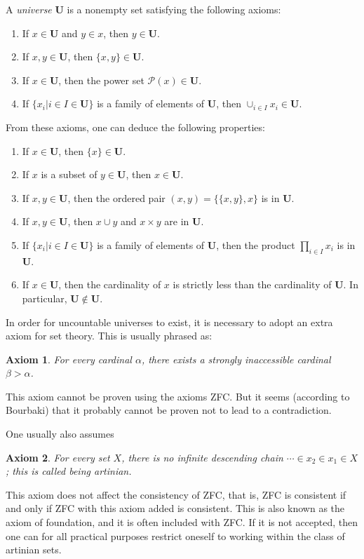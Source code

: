 \documentclass[12pt]{article}
\newtheorem{axiom}{Axiom}
\begin{document}
A {\em universe} $\mathbf{U}$ is a nonempty set satisfying the following axioms:
\begin{enumerate}
  \item If $x\in \mathbf{U}$ and $y\in x$, then $y\in \mathbf{U}$.
  \item If $x,y\in \mathbf{U}$, then $\{x,y\}\in \mathbf{U}$.
  \item If $x\in\mathbf{U}$, then the power set $\mathcal{P}(x)\in\mathbf{U}$.
  \item If $\{x_i | i\in I\in\mathbf{U}\}$ is a family of elements of
        $\mathbf{U}$, then $\cup_{i\in I} x_i\in\mathbf{U}$.
\end{enumerate}

From these axioms, one can deduce the following properties:
\begin{enumerate}
  \item If $x\in\mathbf{U}$, then $\{x\}\in\mathbf{U}$.
  \item If $x$ is a subset of $y\in\mathbf{U}$, then $x\in\mathbf{U}$.
  \item If $x,y\in\mathbf{U}$, then the ordered pair 
        $(x,y) = \{\{x,y\},x\}$ is in $\mathbf{U}$.
  \item If $x,y\in\mathbf{U}$, then $x\cup y$ and $x\times y$ are in 
        $\mathbf{U}$.
  \item If $\{x_i | i\in I\in\mathbf{U}\}$ is a family of elements of
        $\mathbf{U}$, then the product $\prod_{i\in I} x_i$ is in $\mathbf{U}$.
  \item If $x\in \mathbf{U}$, then the cardinality of $x$ is strictly less than
        the cardinality of $\mathbf{U}$.  In particular, 
        $\mathbf{U}\notin\mathbf{U}$.
\end{enumerate}

In order for uncountable universes to exist, it is necessary to adopt an extra axiom for set theory.  This is usually phrased as:
\begin{axiom}
For every cardinal $\alpha$, there exists a strongly inaccessible cardinal $\beta>\alpha$.
\end{axiom}
This axiom cannot be proven using the axioms ZFC.  But it seems (according to Bourbaki) that it probably cannot be proven not to lead to a contradiction.

One usually also assumes
\begin{axiom}
For every set $X$, there is no infinite descending chain $\cdots\in x_2 \in x_1 \in X$; this is called being \emph{artinian}.  
\end{axiom}
This axiom does not affect the consistency of ZFC, that is, ZFC is consistent if and only if ZFC with this axiom added is consistent.  This is also known as the axiom of foundation, and it is often included with ZFC.  If it is not accepted, then one can for all practical purposes restrict oneself to working within the class of artinian sets. 
\end{document}
